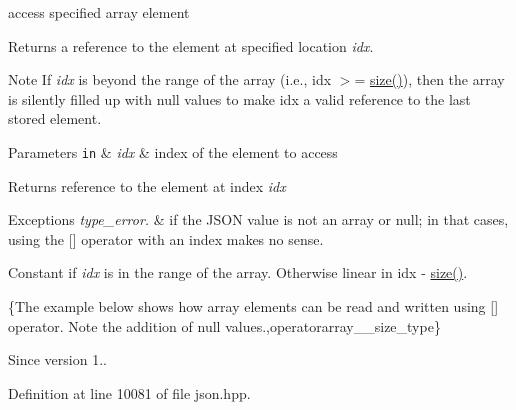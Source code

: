 access specified array element 

Returns a reference to the element at specified location {\itshape idx}.

\begin{DoxyNote}{Note}
If {\itshape idx} is beyond the range of the array (i.\+e., {\ttfamily idx $>$= \hyperlink{classnlohmann_1_1basic__json_a25e27ad0c6d53c01871c5485e1f75b96}{size()}}), then the array is silently filled up with {\ttfamily null} values to make {\ttfamily idx} a valid reference to the last stored element.
\end{DoxyNote}

\begin{DoxyParams}[1]{Parameters}
\mbox{\tt in}  & {\em idx} & index of the element to access\\
\hline
\end{DoxyParams}
\begin{DoxyReturn}{Returns}
reference to the element at index {\itshape idx} 
\end{DoxyReturn}

\begin{DoxyExceptions}{Exceptions}
{\em type\+\_\+error.} & if the J\+S\+ON value is not an array or null; in that cases, using the \mbox{[}\mbox{]} operator with an index makes no sense.\\
\hline
\end{DoxyExceptions}
Constant if {\itshape idx} is in the range of the array. Otherwise linear in {\ttfamily idx -\/ \hyperlink{classnlohmann_1_1basic__json_a25e27ad0c6d53c01871c5485e1f75b96}{size()}}.

\{The example below shows how array elements can be read and written using {\ttfamily \mbox{[}\mbox{]}} operator. Note the addition of {\ttfamily null} values.,operatorarray\+\_\+\+\_\+size\+\_\+type\}

\begin{DoxySince}{Since}
version 1.. 
\end{DoxySince}


Definition at line 10081 of file json.\+hpp.

